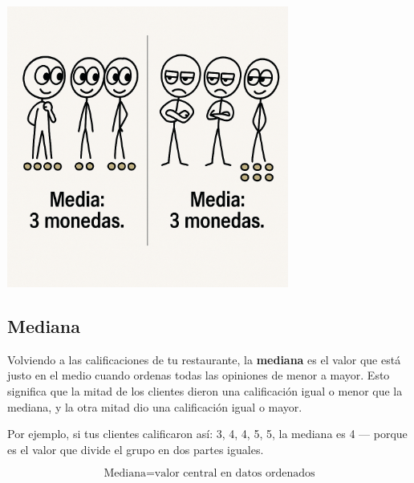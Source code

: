 \documentclass[
  spanish,
  letterpaper,
  DIV=11,
  numbers=noendperiod]{scrreprt}
\begin{document}
\begin{center}
\includegraphics[width=3.64583in,height=\textheight,keepaspectratio]{img/media_3.png}
\end{center}

\subsection{Mediana}\label{mediana}

Volviendo a las calificaciones de tu restaurante, la \textbf{mediana} es
el valor que está justo en el medio cuando ordenas todas las opiniones
de menor a mayor. Esto significa que la mitad de los clientes dieron una
calificación igual o menor que la mediana, y la otra mitad dio una
calificación igual o mayor.

Por ejemplo, si tus clientes calificaron así: 3, 4, 4, 5, 5, la mediana
es 4 --- porque es el valor que divide el grupo en dos partes iguales.

\begin{tcolorbox}[enhanced jigsaw, arc=.35mm, leftrule=.75mm, opacityback=0, left=2mm, breakable, colframe=quarto-callout-tip-color-frame, toprule=.15mm, colback=white, bottomrule=.15mm, rightrule=.15mm]
\begin{minipage}[t]{5.5mm}
\textcolor{quarto-callout-tip-color}{\faLightbulb}
\end{minipage}%
\begin{minipage}[t]{\textwidth - 5.5mm}

\[
\text{Mediana} = \text{valor central en datos ordenados}
\]

\end{minipage}%
\end{tcolorbox}
\end{document}
